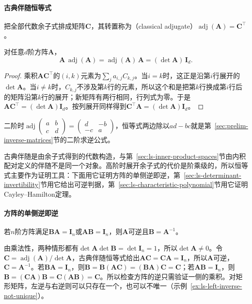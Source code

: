 \paragraph{古典伴随恒等式}
把全部代数余子式排成矩阵$\bm C$，其转置称为（classical adjugate）$\operatorname{adj}(\bm A)=\bm C^\top$。
\begin{theorem}[古典伴随恒等式]
\label{thm:ls-adjugate-identity}
对任意$d$阶方阵$\bm A$，
\[
 \bm A\,\operatorname{adj}(\bm A)
 =\operatorname{adj}(\bm A)\,\bm A
 =(\det\bm A)\,\bm I_d.
\]
\end{theorem}
\begin{proof}
乘积$\bm A\bm C^\top$的$(i,k)$元素为$\sum_j a_{i,j}C_{k,j}$。当$i=k$时，这正是沿第$i$行展开的$\det\bm A$。当$i\neq k$时，$C_{k,j}$不涉及第$k$行的元素，所以这个和是把第$k$行换成第$i$行后的矩阵沿第$k$行的展开；新矩阵有两行相同，行列式为零。于是$\bm A\bm C^\top=(\det\bm A)\bm I_d$。按列展开同样得到$\bm C^\top\bm A=(\det\bm A)\bm I_d$。
\end{proof}
二阶时$\operatorname{adj}\left(\begin{smallmatrix}a&b\\c&d\end{smallmatrix}\right)=\left(\begin{smallmatrix}d&-b\\-c&a\end{smallmatrix}\right)$，恒等式两边除以$ad-bc$就是第~\ref{sec:prelim-inverse-matrices}节的二阶求逆公式。

古典伴随是由余子式得到的代数构造，与第~\ref{sec:ls-inner-product-spaces}节由内积配对定义的伴随不是同一个对象。高阶时展开余子式的代价是阶乘级的，所以恒等式主要作为证明工具：下面用它证明方阵的单侧逆即逆，第~\ref{sec:ls-determinant-invertibility}节用它给出可逆判据，第~\ref{sec:ls-characteristic-polynomial}节用它证明Cayley--Hamilton定理。

\paragraph{方阵的单侧逆即逆}
\label{sec:ls-square-one-sided-inverse}
若$n$阶方阵满足$\bm B\bm A=\bm I_n$或$\bm A\bm B=\bm I_n$，则$\bm A$可逆且$\bm B=\bm A^{-1}$。

由乘法性，两种情形都有$\det\bm A\det\bm B=\det\bm I_n=1$，所以$\det\bm A\neq0$。令$\bm C=\operatorname{adj}(\bm A)/\det\bm A$，古典伴随恒等式给出$\bm A\bm C=\bm C\bm A=\bm I_n$，所以$\bm A$可逆，$\bm C=\bm A^{-1}$。若$\bm B\bm A=\bm I_n$，则$\bm B=\bm B(\bm A\bm C)=(\bm B\bm A)\bm C=\bm C$；若$\bm A\bm B=\bm I_n$，则$\bm B=(\bm C\bm A)\bm B=\bm C(\bm A\bm B)=\bm C$。所以检查方阵的逆只需验证一侧的乘积。对矩形矩阵，左逆与右逆则可以只存在一个，也可以不唯一（示例~\ref{ex:ls-left-inverse-not-unique}）。

